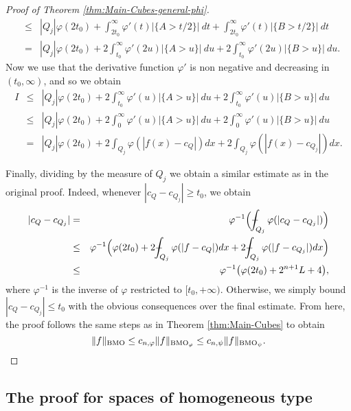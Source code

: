 \documentclass[11pt,a4paper]{amsart}
\theoremstyle{definition}
\theoremstyle{remark}
\numberwithin{equation}{section}
\DeclareMathOperator{\BMO}{BMO}
\def\Xint#1{\mathchoice
  {\XXint\displaystyle\textstyle{#1}}%
  {\XXint\textstyle\scriptstyle{#1}}%
  {\XXint\scriptstyle\scriptscriptstyle{#1}}%
  {\XXint\scriptscriptstyle\scriptscriptstyle{#1}}%
  \!\int}
\def\XXint#1#2#3{{\setbox0=\hbox{$#1{#2#3}{\int}$}
    \vcenter{\hbox{$#2#3$}}\kern-.5\wd0}}
\def\avgint{\Xint-}
\numberwithin{equation}{section}
\begin{document}
\begin{proof}[Proof of Theorem \ref{thm:Main-Cubes-general-phi}]
\begin{eqnarray*}
& \le &
|Q_j|\varphi(2t_0)+\int_{2t_0}^\infty \varphi'(t)|\{ A>t/2\}|\ dt+
\int_{2t_0}^\infty \varphi'(t)|\{ B>t/2\}|\ dt\\
& = &
|Q_j|\varphi(2t_0)+2\int_{t_0}^\infty \varphi'(2u)|\{ A>u\}|\ du+
2\int_{t_0}^\infty \varphi'(2u)|\{ B>u\}|\ du.
\end{eqnarray*}
Now we use that the derivative function $\varphi'$ is non negative and decreasing in $(t_0,\infty)$,  and so we obtain
%
\begin{eqnarray*}
I & \le & 
|Q_j|\varphi(2t_0)+2\int_{t_0}^\infty \varphi'(u)|\{ A>u\}|\ du+
2\int_{t_0}^\infty \varphi'(u)|\{ B>u\}|\ du\\
& \leq &    |Q_j|\varphi(2t_0)+ 2\int_{0}^\infty \varphi'(u)|\{ A>u\}|\ du +  2\int_{0}^\infty \varphi'(u)|\{ B>u\}|\ du\\
%
& = &  |Q_j|\varphi(2t_0)+ 2\int_{Q_j} \varphi(|f(x) -c_Q|) dx + 2\int_{Q_j}\varphi(|f(x)-c_{Q_j}|)dx.
\end{eqnarray*}

Finally, dividing by the measure of $Q_j$ we obtain a similar estimate as in the original proof. Indeed, whenever $|c_Q-c_{Q_j}| \ge t_0$, we obtain
%
\begin{eqnarray*}
|c_Q-c_{Q_j}| & = &\varphi^{-1} \Big( \avgint_{Q_j} \varphi(|c_Q-c_{Q_j}|)\Big) \\
%
& \leq &\varphi^{-1} \Big(\varphi(2t_0)+  2\avgint_{Q_j} \varphi(|f -c_Q|) dx + 2\avgint_{Q_j}\varphi(|f-c_{Q_j}|)dx\Big) \\
%
& \leq & \varphi^{-1} \big(\varphi(2t_0)+  2^{n+1} L +4 \big),
\end{eqnarray*}
where $\varphi^{-1}$ is the inverse of $\varphi$ restricted to $[t_0,+\infty)$. Otherwise, we simply bound $|c_Q-c_{Q_j}| \le t_0$ with the obvious consequences over the final estimate.
From here, the proof follows the same steps as in Theorem \ref{thm:Main-Cubes} to obtain 
\begin{equation*}
\|f\|_{\BMO}\le c_{n,\varphi}\|f\|_{\BMO_\varphi} \le   c_{n,\psi} \|f\|_{\BMO_{\psi}}. \qedhere
\end{equation*}


\end{proof}




\subsection{The proof for spaces of homogeneous type} \label{sec:homogen}
\end{document}
